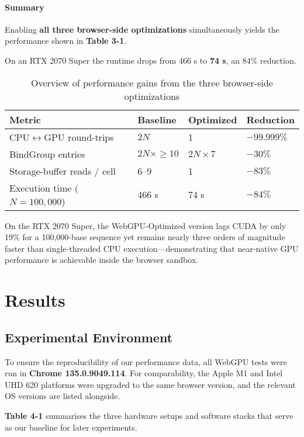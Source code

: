 \documentclass[PhD]{PHlab-thesis}
\begin{document}
\subsubsection{Summary}
Enabling \textbf{all three browser-side optimizations} simultaneously yields the performance shown in \textbf{Table 3-1}.

On an RTX 2070 Super the runtime drops from 466 s to \textbf{74 s}, an 84\% reduction.

\begin{table}[h]
    \centering
      \setlength{\tabcolsep}{6pt}
  \renewcommand{\arraystretch}{1.4}
  \small
    \begin{tabularx}{\textwidth}{|X|X|X|X|}
        \hline
        Metric & Baseline & Optimized & Reduction \\
        \hline
        CPU$\leftrightarrow$GPU round-trips & $2N$ & 1 & $-99.999\%$ \\
        BindGroup entries & $2N \times \geq 10$ & $2N \times 7$ & $-30\%$ \\
        Storage-buffer reads / cell & 6–9 & 1 & $-83\%$ \\
        Execution time ($N = 100,000$) & 466 s & 74 s & $-84\%$ \\
        \hline
    \end{tabularx}
    \caption{Overview of performance gains from the three browser-side optimizations}
    \label{tab:opt_performance}
\end{table}

On the RTX 2070 Super, the WebGPU-Optimized version lags CUDA by only 19\% for a 100,000-base sequence yet remains nearly three orders of magnitude faster than single-threaded CPU execution—demonstrating that near-native GPU performance is achievable inside the browser sandbox.

	
\chapter{Results}
\section{Experimental Environment}
To ensure the reproducibility of our performance data, all WebGPU tests were run in \textbf{Chrome 135.0.9049.114}.
For comparability, the Apple M1 and Intel UHD 620 platforms were upgraded to the same browser version, and the relevant OS versions are listed alongside.

\textbf{Table 4-1} summarises the three hardware setups and software stacks that serve as our baseline for later experiments.
\end{document}
